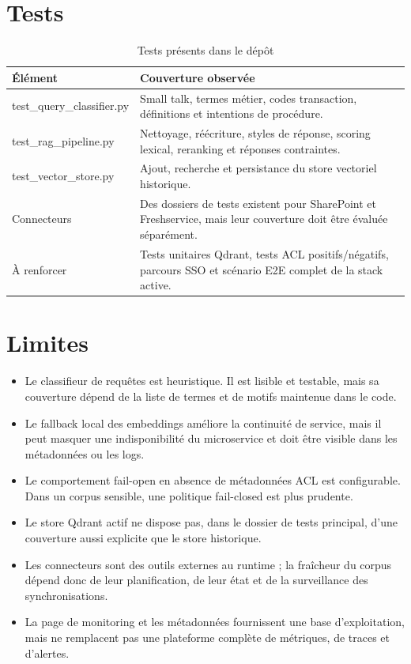\section{Tests}
\begin{table}[H]
\centering
\caption{Tests présents dans le dépôt}
\label{tab:tests_impl_ch6}
\begin{tabular}{p{4.0cm}p{9.2cm}}
\toprule
\textbf{Élément} & \textbf{Couverture observée} \\
\midrule
test\_query\_classifier.py & Small talk, termes métier, codes transaction, définitions et intentions de procédure. \\
test\_rag\_pipeline.py & Nettoyage, réécriture, styles de réponse, scoring lexical, reranking et réponses contraintes. \\
test\_vector\_store.py & Ajout, recherche et persistance du store vectoriel historique. \\
Connecteurs & Des dossiers de tests existent pour SharePoint et Freshservice, mais leur couverture doit être évaluée séparément. \\
À renforcer & Tests unitaires Qdrant, tests ACL positifs/négatifs, parcours SSO et scénario E2E complet de la stack active. \\
\bottomrule
\end{tabular}
\end{table}

\section{Limites}
\begin{itemize}
\item Le classifieur de requêtes est heuristique. Il est lisible et testable, mais sa couverture dépend de la liste de termes et de motifs maintenue dans le code.
\item Le fallback local des embeddings améliore la continuité de service, mais il peut masquer une indisponibilité du microservice et doit être visible dans les métadonnées ou les logs.
\item Le comportement fail-open en absence de métadonnées ACL est configurable. Dans un corpus sensible, une politique fail-closed est plus prudente.
\item Le store Qdrant actif ne dispose pas, dans le dossier de tests principal, d’une couverture aussi explicite que le store historique.
\item Les connecteurs sont des outils externes au runtime ; la fraîcheur du corpus dépend donc de leur planification, de leur état et de la surveillance des synchronisations.
\item La page de monitoring et les métadonnées fournissent une base d’exploitation, mais ne remplacent pas une plateforme complète de métriques, de traces et d’alertes.
\end{itemize}

